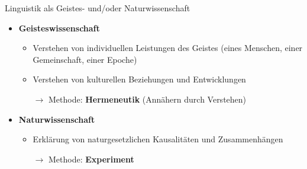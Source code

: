 \begin{frame}{Linguistik als Geistes- und/oder Naturwissenschaft}

	\begin{itemize}
		\item \textbf{Geisteswissenschaft}
		
		\begin{itemize}
			\item Verstehen von individuellen Leistungen des Geistes (eines Menschen, einer Gemeinschaft, einer Epoche)
			\item Verstehen von kulturellen Beziehungen und Entwicklungen
			\item[$\rightarrow$] Methode: \textbf{Hermeneutik} (Annähern durch Verstehen)
		\end{itemize}
		
		\item[]
		\item \textbf{Naturwissenschaft}
		
		\begin{itemize}
			\item Erklärung von naturgesetzlichen Kausalitäten und Zusammenhängen
			\item[$\rightarrow$] Methode: \textbf{Experiment}
		\end{itemize}
		
	\end{itemize}
	
\end{frame}		






